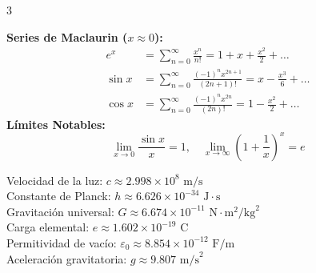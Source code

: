 \documentclass[9pt, letterpaper, landscape]{article}
\begin{document}
\begin{multicols*}{3}
  \begin{tcolorbox}[title=Series de Taylor y Límites Notables, colframe=primary]
    \textbf{Series de Maclaurin ($x \approx 0$):}
    \begin{align*}
      e^x &= \sum_{n=0}^{\infty} \frac{x^n}{n!} = 1 + x + \frac{x^2}{2} + \dots \\
      \sin x &= \sum_{n=0}^{\infty} \frac{(-1)^n x^{2n+1}}{(2n+1)!} = x - \frac{x^3}{6} + \dots \\
      \cos x &= \sum_{n=0}^{\infty} \frac{(-1)^n x^{2n}}{(2n)!} = 1 - \frac{x^2}{2} + \dots
    \end{align*}
    \textbf{Límites Notables:}
    \begin{equation*}
      \lim_{x \to 0} \frac{\sin x}{x} = 1, \quad \lim_{x \to \infty} \left(1 + \frac{1}{x}\right)^x = e
    \end{equation*}
  \end{tcolorbox}

  \begin{tcolorbox}[title=Constantes Físicas Universales, colframe=darkblue]
    Velocidad de la luz: $c \approx 2.998 \times 10^8\text{ m/s}$ \\
    Constante de Planck: $h \approx 6.626 \times 10^{-34}\text{ J}\cdot\text{s}$ \\
    Gravitación universal: $G \approx 6.674 \times 10^{-11}\text{ N}\cdot\text{m}^2/\text{kg}^2$ \\
    Carga elemental: $e \approx 1.602 \times 10^{-19}\text{ C}$ \\
    Permitividad de vacío: $\varepsilon_0 \approx 8.854 \times 10^{-12}\text{ F/m}$ \\
    Aceleración gravitatoria: $g \approx 9.807\text{ m/s}^2$
  \end{tcolorbox}

\end{multicols*}
\end{document}
